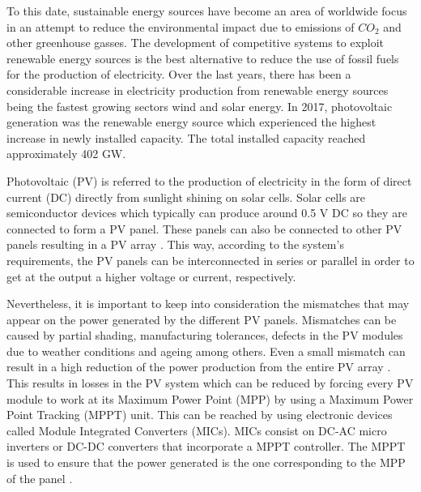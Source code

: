 To this date, sustainable energy sources have become an area of worldwide focus in an attempt to reduce the environmental impact due to emissions of $CO_{2}$ and other greenhouse gasses. The development of competitive systems to exploit renewable energy sources is the best alternative to reduce the use of fossil fuels for the production of electricity. Over the last years, there has been a considerable increase in electricity production from renewable energy sources being the fastest growing sectors wind and solar energy. In 2017, photovoltaic generation was the renewable energy source which experienced the highest increase in newly installed capacity. The total installed capacity reached approximately 402 GW\cite{global}. 

Photovoltaic (PV) is referred to the production of electricity in the form of direct current (DC) directly from sunlight shining on solar cells. Solar cells are semiconductor devices which typically can produce around 0.5 V DC so they are connected to form a PV panel. These panels can also be connected to other PV panels resulting in a PV array \cite{handbook}. This way, according to the system's requirements, the PV panels can be interconnected in series or parallel in order to get at the output a higher voltage or current, respectively.

Nevertheless, it is important to keep into consideration the mismatches that may appear on the power generated by the different PV panels.  Mismatches can be caused by partial shading, manufacturing tolerances, defects in the PV modules due to weather conditions and ageing among others. Even a small mismatch can result in a high reduction of the power production from the entire PV array \cite{MPPmismatch}. This results in losses in the PV system which can be reduced by forcing every PV module to work at its Maximum Power Point (MPP) by using a Maximum Power Point Tracking (MPPT) unit. This can be reached by using electronic devices called Module Integrated Converters (MICs). MICs consist on DC-AC micro inverters or DC-DC converters that incorporate a MPPT controller. The MPPT is used to ensure that the power generated is the one corresponding to the MPP of the panel \cite{MPPmismatch}.